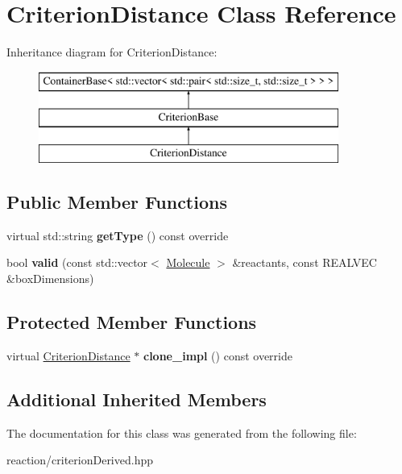 \hypertarget{classCriterionDistance}{}\section{Criterion\+Distance Class Reference}
\label{classCriterionDistance}
Inheritance diagram for Criterion\+Distance\+:\begin{figure}[H]
\begin{center}
\leavevmode
\includegraphics[height=3.000000cm]{classCriterionDistance}
\end{center}
\end{figure}
\subsection*{Public Member Functions}
\begin{DoxyCompactItemize}
\item 
\mbox{\label{classCriterionDistance_a686f1f8b494a7ec3df4ee8dae3893a6b}} 
virtual std\+::string {\bfseries get\+Type} () const override
\item 
\mbox{\label{classCriterionDistance_a8ac92b3bb74ea80a80b78aa1566e46c7}} 
bool {\bfseries valid} (const std\+::vector$<$ \mbox{\hyperlink{classMolecule}{Molecule}} $>$ \&reactants, const R\+E\+A\+L\+V\+EC \&box\+Dimensions)
\end{DoxyCompactItemize}
\subsection*{Protected Member Functions}
\begin{DoxyCompactItemize}
\item 
\mbox{\label{classCriterionDistance_a5445eb7e4b31b679594aca24fcdbf06a}} 
virtual \mbox{\hyperlink{classCriterionDistance}{Criterion\+Distance}} $\ast$ {\bfseries clone\+\_\+impl} () const override
\end{DoxyCompactItemize}
\subsection*{Additional Inherited Members}


The documentation for this class was generated from the following file\+:\begin{DoxyCompactItemize}
\item 
reaction/criterion\+Derived.\+hpp\end{DoxyCompactItemize}
